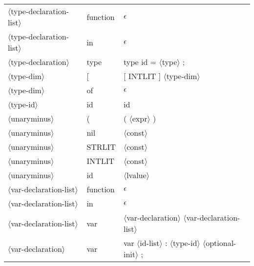 \documentclass[11pt, fleqn]{article}
\newcommand{\atag}[1]{$\langle$#1$\rangle$}
\begin{document}
\begin{longtable}{l|l|l}
\atag{type-declaration-list}		&	function		&	$\epsilon$\\
\atag{type-declaration-list}		&	in		&	$\epsilon$\\
\atag{type-declaration}			&	type 	&	type id = \atag{type} ;		\\
\atag{type-dim}					&	[		&	[ INTLIT ] \atag{type-dim}	\\
\atag{type-dim}					&	of	&	$\epsilon$	\\
\atag{type-id}					&	id		&	id	\\
\atag{unaryminus}				&	(		&	( \atag{expr} )	\\
\atag{unaryminus}				&	nil		&	\atag{const}	\\
\atag{unaryminus}				&	STRLIT		&	\atag{const}	\\
\atag{unaryminus}				&	INTLIT		&	\atag{const}	\\
\atag{unaryminus}				&	id		&	\atag{lvalue}		\\
\atag{var-declaration-list}		&	function		&	$\epsilon$	\\
\atag{var-declaration-list}		&	in	&		$\epsilon$		\\
\atag{var-declaration-list}		&	var		& 	\atag{var-declaration} \atag{var-declaration-list}		\\
\atag{var-declaration}			&	var 		&	var \atag{id-list} : \atag{type-id} \atag{optional-init} ;	\\
\end{longtable}
\end{document}
